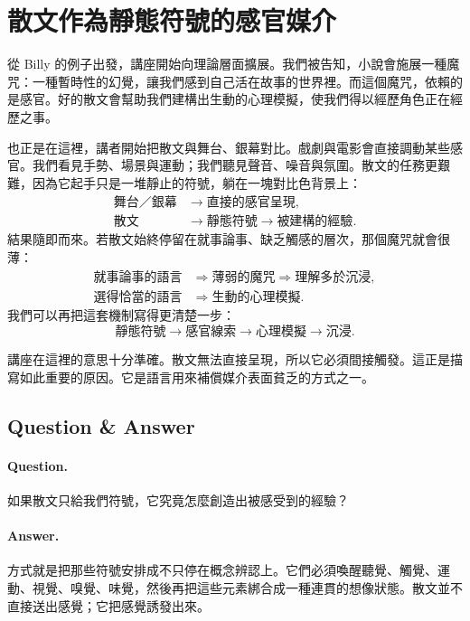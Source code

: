 \section{散文作為靜態符號的感官媒介}

從 Billy 的例子出發，講座開始向理論層面擴展。我們被告知，小說會施展一種魔咒：一種暫時性的幻覺，讓我們感到自己活在故事的世界裡。而這個魔咒，依賴的是感官。好的散文會幫助我們建構出生動的心理模擬，使我們得以經歷角色正在經歷之事。

也正是在這裡，講者開始把散文與舞台、銀幕對比。戲劇與電影會直接調動某些感官。我們看見手勢、場景與運動；我們聽見聲音、噪音與氛圍。散文的任務更艱難，因為它起手只是一堆靜止的符號，躺在一塊對比色背景上：
\begin{align}
\text{舞台／銀幕} &\to \text{直接的感官呈現},\\
\text{散文} &\to \text{靜態符號} \to \text{被建構的經驗}.
\end{align}
結果隨即而來。若散文始終停留在就事論事、缺乏觸感的層次，那個魔咒就會很薄：
\begin{align}
\text{就事論事的語言} &\Rightarrow \text{薄弱的魔咒} \Rightarrow \text{理解多於沉浸},\\
\text{選得恰當的語言} &\Rightarrow \text{生動的心理模擬}.
\end{align}
我們可以再把這套機制寫得更清楚一步：
\begin{equation}
\text{靜態符號} \to \text{感官線索} \to \text{心理模擬} \to \text{沉浸}.
\end{equation}

講座在這裡的意思十分準確。散文無法直接呈現，所以它必須間接觸發。這正是描寫如此重要的原因。它是語言用來補償媒介表面貧乏的方式之一。

\subsection{Question \& Answer}

\paragraph{Question.} 如果散文只給我們符號，它究竟怎麼創造出被感受到的經驗？

\paragraph{Answer.} 方式就是把那些符號安排成不只停在概念辨認上。它們必須喚醒聽覺、觸覺、運動、視覺、嗅覺、味覺，然後再把這些元素綁合成一種連貫的想像狀態。散文並不直接送出感覺；它把感覺誘發出來。


